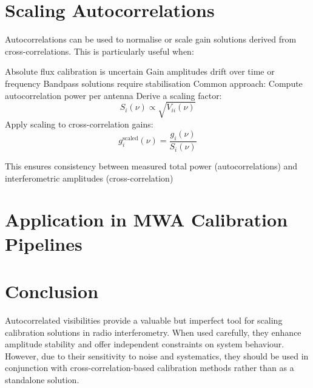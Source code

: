 \documentclass{article}
\begin{document}
\section{Scaling Autocorrelations}
Autocorrelations can be used to normalise or scale gain solutions derived from cross-correlations. This is particularly useful when:

Absolute flux calibration is uncertain
Gain amplitudes drift over time or frequency
Bandpass solutions require stabilisation
Common approach:
Compute autocorrelation power per antenna
Derive a scaling factor:
\begin{equation}
S_i(\nu) \propto \sqrt{V_{ii}(\nu)}
\end{equation}
Apply scaling to cross-correlation gains:
\begin{equation}
g_i^{\text{scaled}}(\nu) = \frac{g_i(\nu)}{S_i(\nu)}
\end{equation}

This ensures consistency between measured total power (autocorrelations) and interferometric amplitudes (cross-correlation)

\section{Application in MWA Calibration Pipelines}

\section{Conclusion}
Autocorrelated visibilities provide a valuable but imperfect tool for scaling calibration solutions in radio interferometry. When used carefully, they enhance amplitude stability and offer independent constraints on system behaviour. However, due to their sensitivity to noise and systematics, they should be used in conjunction with cross-correlation-based calibration methods rather than as a standalone solution.
\end{document}
